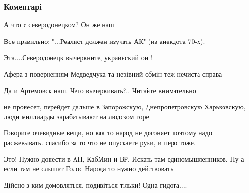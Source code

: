  
 
 
 
 
\subsubsection{Коментарі}

\begin{itemize} %
А что с северодонецком? Он же наш


Все правильно: "...Реалист должен изучать АК" (из анекдота 70-х).

Эта....Северодонецк вычеркните, украинский он !

Афера з поверненням Медведчука та нерівний обмін теж нечиста справа

Да и Артемовск наш. Чего вычеркивать?.. Читайте внимательно


не пронесет, перейдет дальше в Запорожскую, Днепропетровскую Харьковскую, люди
миллиарды зарабатывают на людском горе


Говорите очевидные вещи, но как то народ не догоняет поэтому надо расжевывать.
спасибо за то что не опускаете руки, и перо тоже.


Это! Нужно донести в АП, КабМин и ВР. Искать там единомышленников. Ну а если
там не слышат Голос Народа то нужно действовать.

Дійсно з ким домовляться, подивіться тільки! Одна гидота....

\end{itemize} %
